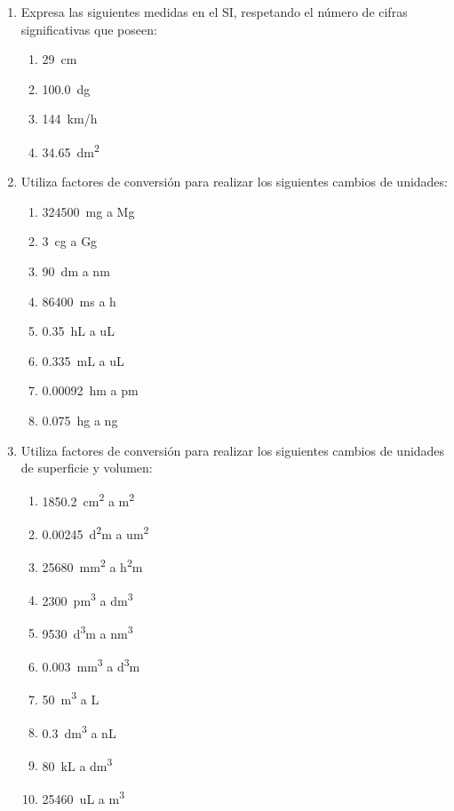 \documentclass[
]{article}
\begin{document}
\begin{enumerate}
\def\labelenumi{\arabic{enumi}.}
\item
  Expresa las siguientes medidas en el SI, respetando el número de
  cifras significativas que poseen:

  \begin{enumerate}
  \def\labelenumii{\arabic{enumii}.}
  \item
    29~cm
  \item
    100.0~dg
  \item
    144~km/h
  \item
    34.65~dm\textsuperscript{2}
  \end{enumerate}
\item
  Utiliza factores de conversión para realizar los siguientes cambios de
  unidades:

  \begin{enumerate}
  \def\labelenumii{\arabic{enumii}.}
  \item
    324500~mg a Mg
  \item
    3~cg a Gg
  \item
    90~dm a nm
  \item
    86400~ms a h
  \item
    0.35~hL a uL
  \item
    0.335~mL a uL
  \item
    0.00092~hm a pm
  \item
    0.075~hg a ng
  \end{enumerate}
\item
  Utiliza factores de conversión para realizar los siguientes cambios de
  unidades de superficie y volumen:

  \begin{enumerate}
  \def\labelenumii{\arabic{enumii}.}
  \item
    1850.2~cm\textsuperscript{2} a m\textsuperscript{2}
  \item
    0.00245~d\textsuperscript{2}m a um\textsuperscript{2}
  \item
    25680~mm\textsuperscript{2} a h\textsuperscript{2}m
  \item
    2300~pm\textsuperscript{3} a dm\textsuperscript{3}
  \item
    9530~d\textsuperscript{3}m a nm\textsuperscript{3}
  \item
    0.003~mm\textsuperscript{3} a d\textsuperscript{3}m
  \item
    50~m\textsuperscript{3} a L
  \item
    0.3~dm\textsuperscript{3} a nL
  \item
    80~kL a dm\textsuperscript{3}
  \item
    25460~uL a m\textsuperscript{3}
  \end{enumerate}
\end{enumerate}
\end{document}
